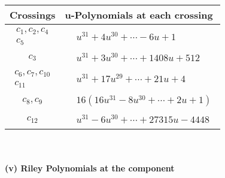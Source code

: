 \documentclass[1p]{elsarticle_modified}
\theoremstyle{definition}
\begin{document}
\begin{tabular}{m{50pt}|m{274pt}}
Crossings & \hspace{64pt}u-Polynomials at each crossing \\
\hline $$\begin{aligned}c_{1},c_{2},c_{4}\\c_{5}\end{aligned}$$&$\begin{aligned}
&u^{31}+4 u^{30}+\cdots-6 u+1
\end{aligned}$\\
\hline $$\begin{aligned}c_{3}\end{aligned}$$&$\begin{aligned}
&u^{31}+3 u^{30}+\cdots+1408 u+512
\end{aligned}$\\
\hline $$\begin{aligned}c_{6},c_{7},c_{10}\\c_{11}\end{aligned}$$&$\begin{aligned}
&u^{31}+17 u^{29}+\cdots+21 u+4
\end{aligned}$\\
\hline $$\begin{aligned}c_{8},c_{9}\end{aligned}$$&$\begin{aligned}
&16(16 u^{31}-8 u^{30}+\cdots+2 u+1)
\end{aligned}$\\
\hline $$\begin{aligned}c_{12}\end{aligned}$$&$\begin{aligned}
&u^{31}-6 u^{30}+\cdots+27315 u-4448
\end{aligned}$\\
\hline
\end{tabular}\\~\\
\newpage\renewcommand{\arraystretch}{1}
\flushleft \textbf{(v) Riley Polynomials at the component}\newline \\
\end{document}
